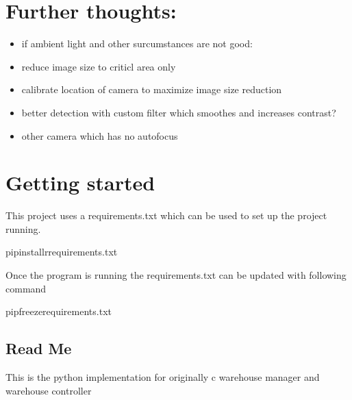 \documentclass[letterpaper,10pt,english]{sphinxmanual}
\begin{document}
\section{Further thoughts:}
\label{\detokenize{index:further-thoughts}}\begin{itemize}
\item {} 
\sphinxAtStartPar
if ambient light and other surcumstances are not good:

\item {} 
\sphinxAtStartPar
reduce image size to criticl area only

\item {} 
\sphinxAtStartPar
calibrate location of camera to maximize image size reduction

\item {} 
\sphinxAtStartPar
better detection with custom filter which smoothes and increases contrast?

\item {} 
\sphinxAtStartPar
other camera which has no autofocus

\end{itemize}


\section{Getting started}
\label{\detokenize{index:getting-started}}
\sphinxAtStartPar
This project uses a requirements.txt which can be used to set up the project running.

\begin{sphinxVerbatim}[commandchars=\\\{\}]
pipinstall\PYGZhy{}rrequirements.txt
\end{sphinxVerbatim}

\sphinxAtStartPar
Once the program is running the requirements.txt can be updated with following command

\begin{sphinxVerbatim}[commandchars=\\\{\}]
pipfreeze\PYGZgt{}requirements.txt
\end{sphinxVerbatim}

\sphinxstepscope


\subsection{Read Me}
\label{\detokenize{readme:read-me}}\label{\detokenize{readme::doc}}
\begin{sphinxVerbatim}[commandchars=\\\{\}]
This is the python implementation for originally c\PYGZsh{} warehouse manager and warehouse controller
\end{sphinxVerbatim}
\end{document}
